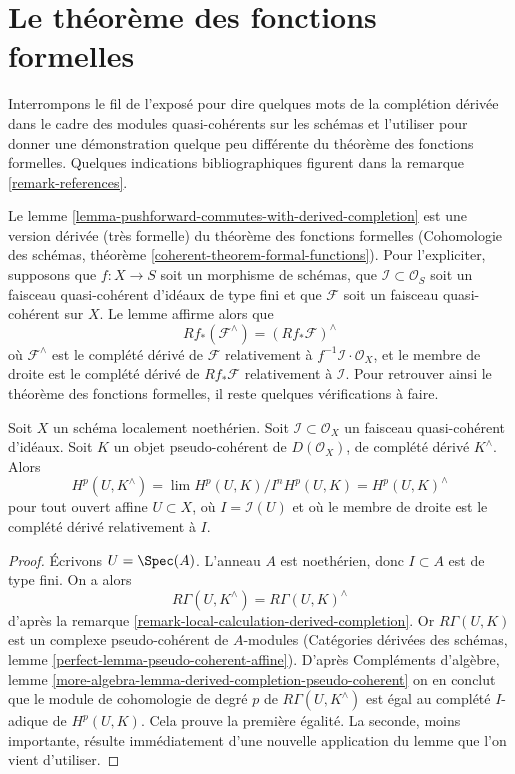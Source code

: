 \section{Le théorème des fonctions formelles}
\label{section-formal-functions}

\noindent
Interrompons le fil de l'exposé pour dire quelques mots de
la complétion dérivée dans le cadre des modules quasi-cohérents sur les schémas
et l'utiliser pour donner une démonstration quelque peu différente du théorème
des fonctions formelles. Quelques indications bibliographiques figurent dans la
remarque \ref{remark-references}.

\medskip\noindent
Le lemme \ref{lemma-pushforward-commutes-with-derived-completion} est une
version dérivée (très formelle) du théorème des fonctions formelles
(Cohomologie des schémas, théorème \ref{coherent-theorem-formal-functions}).
Pour l'expliciter, supposons que $f : X \to S$ soit un morphisme de schémas,
que $\mathcal{I} \subset \mathcal{O}_S$ soit un faisceau quasi-cohérent d'idéaux
de type fini
et que $\mathcal{F}$ soit un faisceau quasi-cohérent sur $X$. Le lemme affirme alors que
\begin{equation}
\label{equation-formal-functions}
Rf_*(\mathcal{F}^\wedge) = (Rf_*\mathcal{F})^\wedge
\end{equation}
où $\mathcal{F}^\wedge$ est le complété dérivé de $\mathcal{F}$
relativement à $f^{-1}\mathcal{I} \cdot \mathcal{O}_X$, et le membre
de droite est le complété dérivé de $Rf_*\mathcal{F}$
relativement à $\mathcal{I}$. Pour retrouver ainsi le théorème
des fonctions formelles, il reste quelques vérifications à faire.

\begin{lemma}
\label{lemma-sections-derived-completion-pseudo-coherent}
Soit $X$ un schéma localement noethérien. Soit $\mathcal{I} \subset \mathcal{O}_X$
un faisceau quasi-cohérent d'idéaux. Soit $K$ un
objet pseudo-cohérent de $D(\mathcal{O}_X)$, de complété dérivé
$K^\wedge$. Alors
$$
H^p(U, K^\wedge) = \lim H^p(U, K)/I^nH^p(U, K) =
H^p(U, K)^\wedge
$$
pour tout ouvert affine $U \subset X$,
où $I = \mathcal{I}(U)$ et où le membre de droite est le complété
dérivé relativement à $I$.
\end{lemma}

\begin{proof}
Écrivons $U = \Spec(A)$. L'anneau $A$ est noethérien,
donc $I \subset A$ est de type fini. On a alors
$$
R\Gamma(U, K^\wedge) = R\Gamma(U, K)^\wedge
$$
d'après la remarque \ref{remark-local-calculation-derived-completion}.
Or $R\Gamma(U, K)$ est un complexe pseudo-cohérent de $A$-modules
(Catégories dérivées des schémas, lemme
\ref{perfect-lemma-pseudo-coherent-affine}).
D'après Compléments d'algèbre, lemme
\ref{more-algebra-lemma-derived-completion-pseudo-coherent}
on en conclut que le module de cohomologie de degré $p$ de $R\Gamma(U, K^\wedge)$
est égal au complété $I$-adique de $H^p(U, K)$.
Cela prouve la première égalité. La seconde, moins importante,
résulte immédiatement d'une nouvelle application du lemme que l'on vient d'utiliser.
\end{proof}

